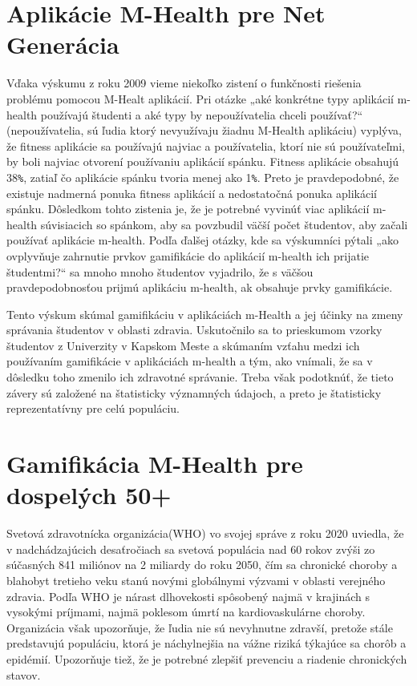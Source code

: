 \documentclass[10pt,twoside,slovak,a4paper]{article}
\begin{document}
\section{Aplikácie M-Health pre Net Generácia} \label{aplikacie_m_health_pre_net_generaciu}
Vďaka výskumu z roku 2009 vieme niekoľko zistení o funkčnosti riešenia problému pomocou M-Healt aplikácií. Pri otázke „aké konkrétne typy aplikácií m-health používajú študenti a aké typy by nepoužívatelia chceli používať?“ (nepoužívatelia, sú ľudia ktorý nevyužívaju žiadnu M-Health aplikáciu) vyplýva, že fitness aplikácie sa používajú najviac a používatelia, ktorí nie sú používateľmi, by boli najviac otvorení používaniu aplikácií spánku. Fitness aplikácie obsahujú 38\texttt{\%}, zatiaľ čo aplikácie spánku tvoria menej ako 1\texttt{\%}. Preto je pravdepodobné, že existuje nadmerná ponuka fitness aplikácií a nedostatočná ponuka aplikácií spánku. Dôsledkom tohto zistenia je, že je potrebné vyvinúť viac aplikácií m-health súvisiacich so spánkom, aby sa povzbudil väčší počet študentov, aby začali používať aplikácie m-health. Podľa ďalšej otázky, kde sa výskumníci pýtali „ako ovplyvňuje zahrnutie prvkov gamifikácie do aplikácií m-health ich prijatie študentmi?“ sa mnoho mnoho študentov vyjadrilo, že s väčšou pravdepodobnosťou prijmú aplikáciu m-health, ak obsahuje prvky gamifikácie. 

Tento výskum skúmal gamifikáciu v aplikáciách m-Health a jej účinky na zmeny správania študentov v oblasti zdravia. Uskutočnilo sa to prieskumom vzorky študentov z Univerzity v Kapskom Meste a skúmaním vzťahu medzi ich používaním gamifikácie v aplikáciách m-health a tým, ako vnímali, že sa v dôsledku toho zmenilo ich zdravotné správanie. Treba však podotknúť, že tieto závery sú založené na štatisticky významných údajoch, a preto je štatisticky reprezentatívny pre celú populáciu.

\section{Gamifikácia M-Health pre dospelých 50+} \label{pre_dospelych_50}
Svetová zdravotnícka organizácia(WHO) vo svojej správe z roku 2020 uviedla, že v nadchádzajúcich desaťročiach sa svetová populácia nad 60 rokov zvýši zo súčasných 841 miliónov na 2 miliardy do roku 2050, čím sa chronické choroby a blahobyt tretieho veku stanú novými globálnymi výzvami v oblasti verejného zdravia. Podľa WHO je nárast dlhovekosti spôsobený najmä v krajinách s vysokými príjmami, najmä poklesom úmrtí na kardiovaskulárne choroby. Organizácia však upozorňuje, že ľudia nie sú nevyhnutne zdravší, pretože stále predstavujú populáciu, ktorá je náchylnejšia na vážne riziká týkajúce sa chorôb a epidémií. Upozorňuje tiež, že je potrebné zlepšiť prevenciu a riadenie chronických stavov. 
\end{document}
